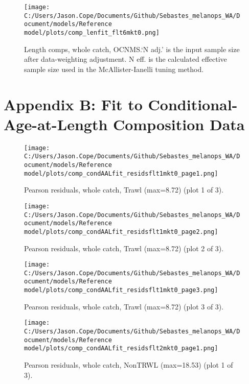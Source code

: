 \documentclass[11pt,
  english,
  letterpaper,
]{article}
\begin{document}
\begin{figure}
\centering
\texttt{[image: C:/Users/Jason.Cope/Documents/Github/Sebastes\_melanops\_WA/Document/models/Reference model/plots/comp\_lenfit\_flt6mkt0.png]}
\caption{Length comps, whole catch, OCNMS.`N adj.' is the input sample size after data-weighting adjustment. N eff. is the calculated effective sample size used in the McAllister-Ianelli tuning method.\label{fig:comp_lenfit_flt6mkt0}}
\end{figure}

\clearpage

\hypertarget{app-b}{%
\section{Appendix B: Fit to Conditional-Age-at-Length Composition Data}\label{app-b}}

\begin{figure}
\centering
\texttt{[image: C:/Users/Jason.Cope/Documents/Github/Sebastes\_melanops\_WA/Document/models/Reference model/plots/comp\_condAALfit\_residsflt1mkt0\_page1.png]}
\caption{Pearson residuals, whole catch, Trawl (max=8.72) (plot 1 of 3).\label{fig:comp_condAALfit_residsflt1mkt0_page1}}
\end{figure}

\begin{figure}
\centering
\texttt{[image: C:/Users/Jason.Cope/Documents/Github/Sebastes\_melanops\_WA/Document/models/Reference model/plots/comp\_condAALfit\_residsflt1mkt0\_page2.png]}
\caption{Pearson residuals, whole catch, Trawl (max=8.72) (plot 2 of 3).\label{fig:comp_condAALfit_residsflt1mkt0_page2}}
\end{figure}

\begin{figure}
\centering
\texttt{[image: C:/Users/Jason.Cope/Documents/Github/Sebastes\_melanops\_WA/Document/models/Reference model/plots/comp\_condAALfit\_residsflt1mkt0\_page3.png]}
\caption{Pearson residuals, whole catch, Trawl (max=8.72) (plot 3 of 3).\label{fig:comp_condAALfit_residsflt1mkt0_page3}}
\end{figure}

\begin{figure}
\centering
\texttt{[image: C:/Users/Jason.Cope/Documents/Github/Sebastes\_melanops\_WA/Document/models/Reference model/plots/comp\_condAALfit\_residsflt2mkt0\_page1.png]}
\caption{Pearson residuals, whole catch, NonTRWL (max=18.53) (plot 1 of 3).\label{fig:comp_condAALfit_residsflt2mkt0_page1}}
\end{figure}
\end{document}

